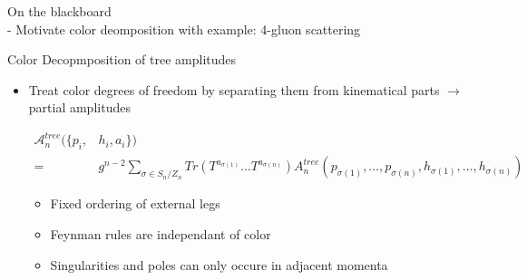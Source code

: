 \documentclass[10pt]{beamer}
\begin{document}
{
\begin{frame}[standout]
    On the blackboard \\
    - Motivate color deomposition with example: 4-gluon scattering
\end{frame}
}

\begin{frame}[fragile]{Color Decopmposition of tree amplitudes}

    \begin{itemize}[<+->]
        \item[] Treat color degrees of freedom by separating them from kinematical parts $\rightarrow$ \alert{partial amplitudes} \cite{bg87colorordering}

        {\scriptsize
        \begin{equation}
            \begin{aligned}
                \mathcal{A}_n^{tree}(\{p_i, &h_i, a_i\}) \\
                = &g^{n-2} \sum_{\sigma \in S_n/Z_n} Tr(T^{a_{\sigma(1)}} \dots T^{a_{\sigma(n)}}) A_n^{tree}(p_{\sigma(1)}, \dots, p_{\sigma(n)}, h_{\sigma(1)}, \dots, h_{\sigma(n)}) \label{eq:decomp}
            \end{aligned}
        \end{equation}
        }

        \begin{itemize}[<+->]
            \item Fixed ordering of external legs
            \item Feynman rules are independant of color
            \item Singularities and poles can only occure in adjacent momenta
        \end{itemize}
    \end{itemize}

\end{frame}
\end{document}
